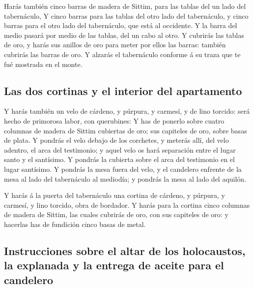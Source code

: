  Harás también cinco barras de madera de Sittim, para las
tablas del un lado del tabernáculo,  Y cinco barras para
las tablas del otro lado del tabernáculo, y cinco barras para el otro
lado del tabernáculo, que está al occidente.  Y la barra
del medio pasará por medio de las tablas, del un cabo al otro.
 Y cubrirás las tablas de oro, y harás sus anillos de oro
para meter por ellos las barras: también cubrirás las barras de oro.
 Y alzarás el tabernáculo conforme á su traza que te fué
mostrada en el monte.

\hypertarget{las-dos-cortinas-y-el-interior-del-apartamento}{%
\subsection{Las dos cortinas y el interior del
apartamento}\label{las-dos-cortinas-y-el-interior-del-apartamento}}

 Y harás también un velo de cárdeno, y púrpura, y
carmesí, y de lino torcido: será hecho de primorosa labor, con
querubines:  Y has de ponerlo sobre cuatro columnas de
madera de Sittim cubiertas de oro; sus capiteles de oro, sobre basas de
plata.  Y pondrás el velo debajo de los corchetes, y
meterás allí, del velo adentro, el arca del testimonio; y aquel velo os
hará separación entre el lugar santo y el santísimo.  Y
pondrás la cubierta sobre el arca del testimonio en el lugar santísimo.
 Y pondrás la mesa fuera del velo, y el candelero
enfrente de la mesa al lado del tabernáculo al mediodía; y pondrás la
mesa al lado del aquilón.

 Y harás á la puerta del tabernáculo una cortina de
cárdeno, y púrpura, y carmesí, y lino torcido, obra de bordador.
 Y harás para la cortina cinco columnas de madera de
Sittim, las cuales cubrirás de oro, con sus capiteles de oro: y hacerlas
has de fundición cinco basas de metal.

\hypertarget{instrucciones-sobre-el-altar-de-los-holocaustos-la-explanada-y-la-entrega-de-aceite-para-el-candelero}{%
\subsection{Instrucciones sobre el altar de los holocaustos, la
explanada y la entrega de aceite para el
candelero}\label{instrucciones-sobre-el-altar-de-los-holocaustos-la-explanada-y-la-entrega-de-aceite-para-el-candelero}}

